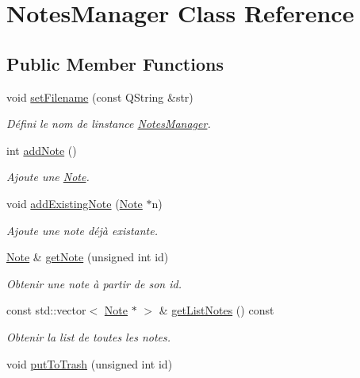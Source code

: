 \hypertarget{class_notes_manager}{}\section{Notes\+Manager Class Reference}
\label{class_notes_manager}
\subsection*{Public Member Functions}
\begin{DoxyCompactItemize}
\item 
void \hyperlink{class_notes_manager_aaa57ac37417937f81173c0ad93298a2a}{set\+Filename} (const Q\+String \&str)
\begin{DoxyCompactList}\small\item\em Défini le nom de l\textquotesingle{}instance \hyperlink{class_notes_manager}{Notes\+Manager}. \end{DoxyCompactList}\item 
int \hyperlink{class_notes_manager_ac94f24bd2797edf14146d9caa1a50f36}{add\+Note} ()
\begin{DoxyCompactList}\small\item\em Ajoute une \hyperlink{class_note}{Note}. \end{DoxyCompactList}\item 
void \hyperlink{class_notes_manager_a2155d076ae6e1044e621f90ebc669466}{add\+Existing\+Note} (\hyperlink{class_note}{Note} $\ast$n)
\begin{DoxyCompactList}\small\item\em Ajoute une note déjà existante. \end{DoxyCompactList}\item 
\hyperlink{class_note}{Note} \& \hyperlink{class_notes_manager_a559c0b690aa23fb568b4a8e53a6f51cc}{get\+Note} (unsigned int id)
\begin{DoxyCompactList}\small\item\em Obtenir une note à partir de son id. \end{DoxyCompactList}\item 
const std\+::vector$<$ \hyperlink{class_note}{Note} $\ast$ $>$ \& \hyperlink{class_notes_manager_a423e040490fa4a8244acd90c754fe7b5}{get\+List\+Notes} () const
\begin{DoxyCompactList}\small\item\em Obtenir la list de toutes les notes. \end{DoxyCompactList}\item 
void \hyperlink{class_notes_manager_a69ef4ff2eb05ec962c7f8cb80d0d15d3}{put\+To\+Trash} (unsigned int id)

\end{DoxyCompactItemize}
